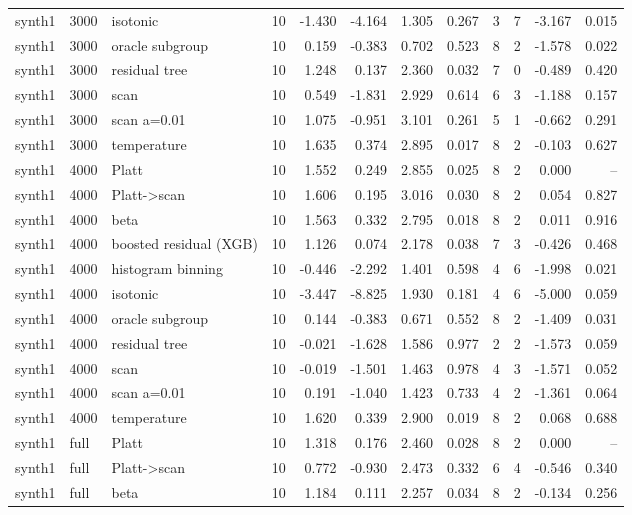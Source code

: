 \begin{tabular}{lllrrrrrrrrr}
synth1 & 3000 & isotonic & 10 & -1.430 & -4.164 & 1.305 & 0.267 & 3 & 7 & -3.167 & 0.015 \\
synth1 & 3000 & oracle subgroup & 10 & 0.159 & -0.383 & 0.702 & 0.523 & 8 & 2 & -1.578 & 0.022 \\
synth1 & 3000 & residual tree & 10 & 1.248 & 0.137 & 2.360 & 0.032 & 7 & 0 & -0.489 & 0.420 \\
synth1 & 3000 & scan & 10 & 0.549 & -1.831 & 2.929 & 0.614 & 6 & 3 & -1.188 & 0.157 \\
synth1 & 3000 & scan a=0.01 & 10 & 1.075 & -0.951 & 3.101 & 0.261 & 5 & 1 & -0.662 & 0.291 \\
synth1 & 3000 & temperature & 10 & 1.635 & 0.374 & 2.895 & 0.017 & 8 & 2 & -0.103 & 0.627 \\
synth1 & 4000 & Platt & 10 & 1.552 & 0.249 & 2.855 & 0.025 & 8 & 2 & 0.000 & -- \\
synth1 & 4000 & Platt->scan & 10 & 1.606 & 0.195 & 3.016 & 0.030 & 8 & 2 & 0.054 & 0.827 \\
synth1 & 4000 & beta & 10 & 1.563 & 0.332 & 2.795 & 0.018 & 8 & 2 & 0.011 & 0.916 \\
synth1 & 4000 & boosted residual (XGB) & 10 & 1.126 & 0.074 & 2.178 & 0.038 & 7 & 3 & -0.426 & 0.468 \\
synth1 & 4000 & histogram binning & 10 & -0.446 & -2.292 & 1.401 & 0.598 & 4 & 6 & -1.998 & 0.021 \\
synth1 & 4000 & isotonic & 10 & -3.447 & -8.825 & 1.930 & 0.181 & 4 & 6 & -5.000 & 0.059 \\
synth1 & 4000 & oracle subgroup & 10 & 0.144 & -0.383 & 0.671 & 0.552 & 8 & 2 & -1.409 & 0.031 \\
synth1 & 4000 & residual tree & 10 & -0.021 & -1.628 & 1.586 & 0.977 & 2 & 2 & -1.573 & 0.059 \\
synth1 & 4000 & scan & 10 & -0.019 & -1.501 & 1.463 & 0.978 & 4 & 3 & -1.571 & 0.052 \\
synth1 & 4000 & scan a=0.01 & 10 & 0.191 & -1.040 & 1.423 & 0.733 & 4 & 2 & -1.361 & 0.064 \\
synth1 & 4000 & temperature & 10 & 1.620 & 0.339 & 2.900 & 0.019 & 8 & 2 & 0.068 & 0.688 \\
synth1 & full & Platt & 10 & 1.318 & 0.176 & 2.460 & 0.028 & 8 & 2 & 0.000 & -- \\
synth1 & full & Platt->scan & 10 & 0.772 & -0.930 & 2.473 & 0.332 & 6 & 4 & -0.546 & 0.340 \\
synth1 & full & beta & 10 & 1.184 & 0.111 & 2.257 & 0.034 & 8 & 2 & -0.134 & 0.256 \\

\end{tabular}

